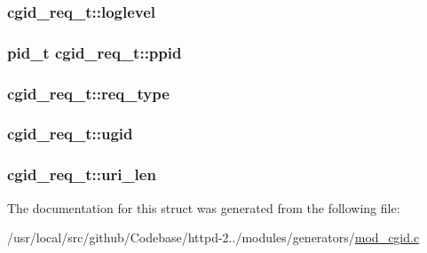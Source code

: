 \subsubsection[{\texorpdfstring{loglevel}{loglevel}}]{ cgid\+\_\+req\+\_\+t\+::loglevel}\hypertarget{structcgid__req__t_aea88179740854cf56d494c28870518dc}{}\label{structcgid__req__t_aea88179740854cf56d494c28870518dc}
\subsubsection[{\texorpdfstring{ppid}{ppid}}]{\setlength{\rightskip}{0pt plus 5cm}pid\+\_\+t cgid\+\_\+req\+\_\+t\+::ppid}\hypertarget{structcgid__req__t_ab7bb2bf4887a7648d5d9a7dce0e015ec}{}\label{structcgid__req__t_ab7bb2bf4887a7648d5d9a7dce0e015ec}
\subsubsection[{\texorpdfstring{req\+\_\+type}{req_type}}]{ cgid\+\_\+req\+\_\+t\+::req\+\_\+type}\hypertarget{structcgid__req__t_aaf063f26171b6f08dbddc339146e50d9}{}\label{structcgid__req__t_aaf063f26171b6f08dbddc339146e50d9}
\subsubsection[{\texorpdfstring{ugid}{ugid}}]{ cgid\+\_\+req\+\_\+t\+::ugid}\hypertarget{structcgid__req__t_a68ba007c3f944b55e00a672028080f5e}{}\label{structcgid__req__t_a68ba007c3f944b55e00a672028080f5e}
\subsubsection[{\texorpdfstring{uri\+\_\+len}{uri_len}}]{ cgid\+\_\+req\+\_\+t\+::uri\+\_\+len}\hypertarget{structcgid__req__t_ac063763f9087be8b770c195feb56129f}{}\label{structcgid__req__t_ac063763f9087be8b770c195feb56129f}


The documentation for this struct was generated from the following file\+:\begin{DoxyCompactItemize}
\item 
/usr/local/src/github/\+Codebase/httpd-\/2../modules/generators/\hyperlink{mod__cgid_8c}{mod\+\_\+cgid.\+c}\end{DoxyCompactItemize}
